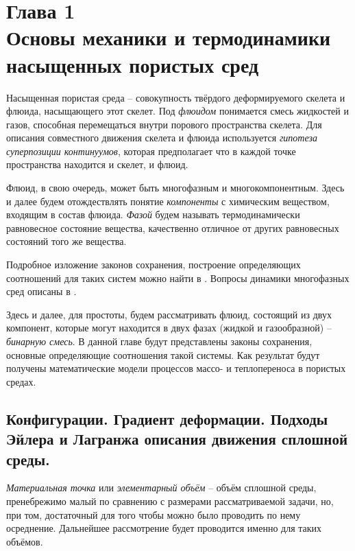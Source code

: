 \section*{Глава 1\\Основы механики и термодинамики насыщенных пористых сред}
\setcounter{section}{1}
\setcounter{subsection}{0}
\setcounter{equation}{0}

	Насыщенная пористая среда -- совокупность твёрдого деформируемого скелета и флюида, насыщающего этот скелет.
	Под \textit{флюидом} понимается смесь жидкостей и газов, способная перемещаться внутри порового пространства скелета.
	Для описания совместного движения скелета и флюида используется \textit{гипотеза суперпозиции континуумов}, которая предполагает что в каждой точке пространства находится и скелет, и флюид. 

	Флюид, в свою очередь, может быть многофазным и многокомпонентным. Здесь и далее будем отождествлять понятие \textit{компоненты} с химическим веществом, входящим в состав флюида. \textit{Фазой} будем называть термодинамически равновесное состояние вещества, качественно отличное от других равновесных состояний того же вещества. 

	Подробное изложение законов сохранения, построение определяющих соотношений для таких систем можно найти в \cite{basniev, fortov, kondaurov, checkalyuk}. Вопросы динамики многофазных сред описаны в \cite{nigmatulin}.
	
	Здесь и далее, для простоты, будем рассматривать флюид, состоящий из двух компонент, которые могут находится в двух фазах (жидкой и газообразной) -- \textit{бинарную смесь}.
	В данной главе будут представлены законы сохранения, основные определяющие соотношения такой системы. Как результат будут получены математические модели 	процессов массо- и теплопереноса в пористых средах.

\subsection{Конфигурации. Градиент деформации. Подходы Эйлера и Лагранжа описания движения сплошной среды.}
	\textit{Материальная точка} или \textit{элементарный объём} -- объём сплошной среды, пренебрежимо малый по сравнению с размерами рассматриваемой задачи, но, при том,   достаточный для того чтобы можно было проводить по нему осреднение. Дальнейшее рассмотрение будет проводится именно для таких объёмов.
	
